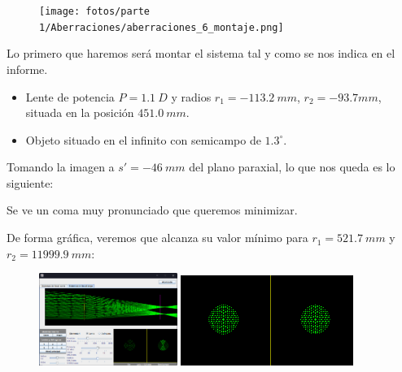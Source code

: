 \documentclass[11pt]{article}
\begin{document}
        \begin{figure}
            \vspace{-0.5cm}
            \centering
            \texttt{[image: fotos/parte 1/Aberraciones/aberraciones\_6\_montaje.png]}
            \label{fig:aberraciones_6_montaje}
        \end{figure}
        \noindent Lo primero que haremos será montar el sistema tal y como se nos indica en el informe.
        \begin{itemize}
            \item Lente de potencia $P = 1.1\ D$ y radios $r_1 = -113.2\ mm$, $r_2 = -93.7 mm$, situada en la posición $451.0\ mm$.
            \item Objeto situado en el infinito con semicampo de $1.3^\circ$.
        \end{itemize}
        \vspace{18mm}
        \noindent Tomando la imagen a $s' = -46\ mm$ del plano paraxial, lo que nos queda es lo siguiente:
        
        \noindent Se ve un coma muy pronunciado que queremos minimizar.
        
        \clearpage 
        De forma gráfica, veremos que alcanza su valor mínimo para $r_1 = 521.7\ mm$ y $r_2 = 11999.9\ mm$:
        \begin{figure}[ht]
            \centering
            \includegraphics[width=0.4\textwidth]{fotos/parte 1/Aberraciones/Aberración Esférica/coma_min_nuevo.png}
            \includegraphics[width=0.5\textwidth]{fotos/parte 1/Aberraciones/Aberración Esférica/coma_min_nuevo (1).png}
        \end{figure}
            
\end{document}
